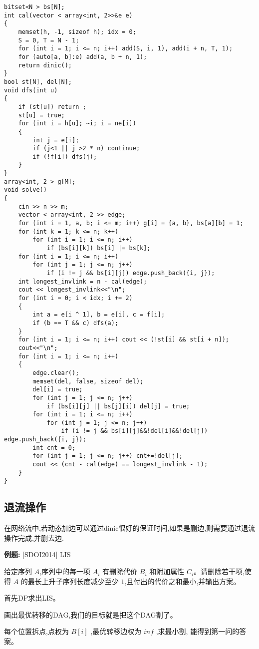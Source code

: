 \documentclass[a4paper, fontset=none]{ctexart}
\begin{document}
\begin{verbatim}
bitset<N > bs[N];
int cal(vector < array<int, 2>>&e e)
{
    memset(h, -1, sizeof h); idx = 0;
    S = 0, T = N - 1;
    for (int i = 1; i <= n; i++) add(S, i, 1), add(i + n, T, 1);
    for (auto[a, b]:e) add(a, b + n, 1);
    return dinic();
}
bool st[N], del[N];
void dfs(int u)
{
    if (st[u]) return ;
    st[u] = true;
    for (int i = h[u]; ~i; i = ne[i])
    {
        int j = e[i];
        if (j<1 || j >2 * n) continue;
        if (!f[i]) dfs(j);
    }
}
array<int, 2 > g[M];
void solve()
{
    cin >> n >> m;
    vector < array<int, 2 >> edge;
    for (int i = 1, a, b; i <= m; i++) g[i] = {a, b}, bs[a][b] = 1;
    for (int k = 1; k <= n; k++)
        for (int i = 1; i <= n; i++)
            if (bs[i][k]) bs[i] |= bs[k];
    for (int i = 1; i <= n; i++)
        for (int j = 1; j <= n; j++)
            if (i != j && bs[i][j]) edge.push_back({i, j});
    int longest_invlink = n - cal(edge);
    cout << longest_invlink<<"\n";
    for (int i = 0; i < idx; i += 2)
    {
        int a = e[i ^ 1], b = e[i], c = f[i];
        if (b == T && c) dfs(a);
    }
    for (int i = 1; i <= n; i++) cout << (!st[i] && st[i + n]);
    cout<<"\n";
    for (int i = 1; i <= n; i++)
    {
        edge.clear();
        memset(del, false, sizeof del);
        del[i] = true;
        for (int j = 1; j <= n; j++)
            if (bs[i][j] || bs[j][i]) del[j] = true;
        for (int i = 1; i <= n; i++)
            for (int j = 1; j <= n; j++)
                if (i != j && bs[i][j]&&!del[i]&&!del[j]) edge.push_back({i, j});
        int cnt = 0;
        for (int j = 1; j <= n; j++) cnt+=!del[j];
        cout << (cnt - cal(edge) == longest_invlink - 1);
    }
}
\end{verbatim}
\subsection{退流操作}

在网络流中,若动态加边可以通过dinic很好的保证时间,如果是删边,则需要通过退流操作完成,并删去边.

\textbf{例题:}
[SDOI2014] LIS

给定序列 $A$,序列中的每一项 $A_i$ 有删除代价 $B_i$ 和附加属性 $C_i$。请删除若干项,使得 $A$ 的最长上升子序列长度减少至少 $1$,且付出的代价之和最小,并输出方案。

首先DP求出LIS。

画出最优转移的DAG,我们的目标就是把这个DAG割了。

每个位置拆点,点权为 $B[i]$ ,最优转移边权为 $inf$ ,求最小割, 能得到第一问的答案。
\end{document}
